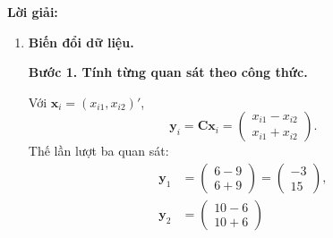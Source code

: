\documentclass[11pt,a4paper]{article}
\renewcommand{\boldsymbol}[1]{\symbf{#1}}
\newenvironment{solution}{%
  \par\medskip\noindent\textbf{Lời giải:}\par\nobreak\smallskip\noindent\ignorespaces
}{\par}
\newcommand{\answer}[1]{\boxed{#1}}
\newcommand{\step}[2]{\par\medskip\noindent\textbf{Bước #1. #2}\par\nopagebreak[4]\smallskip\noindent}
\begin{document}
\begin{solution}
\begin{enumerate}[label=\textbf{\alph*)}]
\step{5}{Tính dạng toàn phương tổng quát.}
Đặt $u=8-a$, $v=6-b$, do đó $\mathbf{d}_X=(u,v)'$.
\begin{align*}
\mathbf{S}_X^{-1}\mathbf{d}_X
&=\frac1{27}\begin{pmatrix}9u+3v\\3u+4v\end{pmatrix},\\
\mathbf{d}_X'\mathbf{S}_X^{-1}\mathbf{d}_X
&=\frac1{27}\{u(9u+3v)+v(3u+4v)\}\\
&=\frac1{27}(9u^2+3uv+3uv+4v^2),\\
T_X^2&=\frac3{27}(9u^2+6uv+4v^2).
\end{align*}
\[
\answer{T_X^2=\frac19(9u^2+6uv+4v^2)}.
\]
\step{6}{Minh họa với hai giả định riêng biệt.}
\emph{Giả định 1:} nếu chọn $\boldsymbol{\mu}_0=(7,11)'$ như Bài 3.1,
$u=8-7=1$, $v=6-11=-5$. Tính từng hạng tử:
\begin{align*}
9u^2&=9(1)^2=9,\\
6uv&=6(1)(-5)=-30,\\
4v^2&=4(-5)^2=100,\\
T_X^2&=\frac{9-30+100}{9}=\answer{\frac{79}{9}\approx8.7778}.
\end{align*}
\emph{Giả định 2:} nếu chọn $\boldsymbol{\mu}_0=\mathbf{0}$,
$u=8$, $v=6$. Khi đó
\begin{align*}
9u^2&=9\cdot64=576,\\
6uv&=6\cdot8\cdot6=288,\\
4v^2&=4\cdot36=144,\\
T_X^2&=\frac{576+288+144}{9}=\frac{1008}{9}=\answer{112}.
\end{align*}
\item \textbf{Biến đổi dữ liệu.}\par\nopagebreak[4]
\step{1}{Tính từng quan sát theo công thức.}
Với $\mathbf{x}_i=(x_{i1},x_{i2})'$,
\[
\mathbf{y}_i=\mathbf{C}\mathbf{x}_i
=\begin{pmatrix}x_{i1}-x_{i2}\\x_{i1}+x_{i2}\end{pmatrix}.
\]
Thế lần lượt ba quan sát:
\begin{align*}
\mathbf{y}_1&=\begin{pmatrix}6-9\\6+9\end{pmatrix}
=\begin{pmatrix}-3\\15\end{pmatrix},\\
\mathbf{y}_2&=\begin{pmatrix}10-6\\10+6\end{pmatrix}

\end{align*}
\end{enumerate}
\end{solution}
\end{document}
